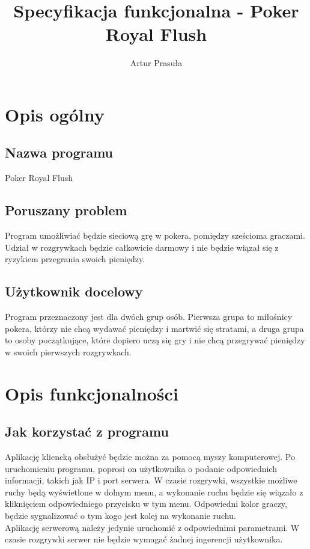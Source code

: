 \documentclass{article}
\title{Specyfikacja funkcjonalna - Poker Royal Flush}
\author{Artur Prasuła}
\begin{document}
\maketitle
\tableofcontents
\newpage

\section{Opis ogólny}
    \subsection{Nazwa programu}
        Poker Royal Flush
    
    \subsection{Poruszany problem}
        Program umożliwiać będzie sieciową grę w pokera, pomiędzy sześcioma graczami.
        Udział w rozgrywkach będzie całkowicie darmowy i nie będzie wiązał się z ryzykiem przegrania swoich pieniędzy.
    
    \subsection{Użytkownik docelowy}
        Program przeznaczony jest dla dwóch grup osób.
        Pierwsza grupa to miłośnicy pokera, którzy nie chcą wydawać pieniędzy i martwić się stratami, 
        a druga grupa to osoby początkujące, które dopiero uczą się gry i nie chcą przegrywać pieniędzy w swoich pierwszych rozgrywkach.

\section{Opis funkcjonalności}
    \subsection{Jak korzystać z programu}
        Aplikację kliencką obsłużyć będzie można za pomocą myszy komputerowej.
        Po uruchomieniu programu, poprosi on użytkownika o podanie odpowiednich informacji, takich jak IP i port serwera.
        W czasie rozgrywki, wszystkie możliwe ruchy będą wyświetlone w dolnym menu, a wykonanie ruchu będzie się wiązało z kliknięciem odpowiedniego przycisku w tym menu. Odpowiedni kolor graczy, będzie sygnalizować o tym kogo jest kolej na wykonanie ruchu.
        \\
        Aplikację serwerową należy jedynie uruchomić z odpowiednimi parametrami. W czasie rozgrywki serwer nie będzie wymagać żadnej ingerencji użytkownika.
    
\end{document}
